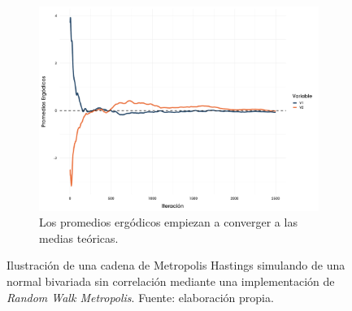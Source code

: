 \begin{figure}[h]
    ~
    \begin{subfigure}{0.3\textwidth}
        \includegraphics[width=\textwidth]{Figs/Bayes/Ejemplo3_RWM}
        \caption{Los promedios ergódicos empiezan a converger a las medias teóricas.}
        \label{fig:RWM_C}
    \end{subfigure}
    \caption{Ilustración de una cadena de Metropolis Hastings simulando de una normal bivariada sin correlación mediante una implementación de \textit{Random Walk Metropolis}. Fuente: elaboración propia.}\label{fig:RWM}
\end{figure}
